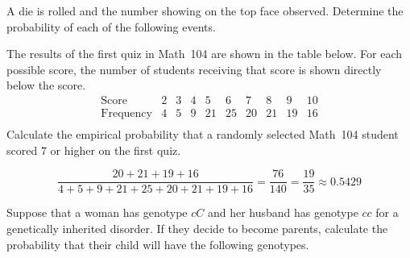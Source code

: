 \documentclass[addpoints,12pt]{exam}
\begin{document}
\begin{questions}

\question[15] A die is rolled and the number
showing on the top face observed. Determine the probability
of each of the following events.
\newpage

\question[10] The results of the first quiz in Math~104 are
shown in the table below. For each possible score, the number
of students receiving that score is shown directly below
the score.
\[\begin{array}{c|cccccccccc}
\text{Score}&2&3&4&5&6&7&8&9&10\\\hline
\text{Frequency}&4&5&9&21&25&20&21&19&16\\
\end{array}\]
Calculate the empirical probability that a randomly
selected Math~104 student scored $7$ or higher
on the first quiz.
\begin{solution}[2in]
\[\frac{20+21+19+16}{4+5+9+21+25+20+21+19+16}
=\frac{76}{140}=\frac{19}{35}\approx 0.5429\]
\end{solution}

\question[15] Suppose that a woman has genotype $cC$
and her husband has genotype $cc$ for a
genetically inherited disorder.
If they decide to become parents, calculate the
probability that their child will
have the following genotypes.
\end{questions}
\end{document}
